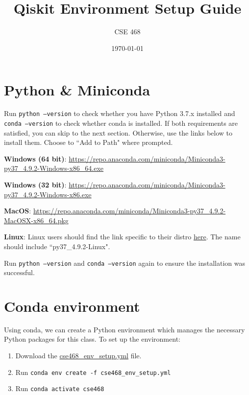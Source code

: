 \documentclass[12pt]{article}
\title{Qiskit Environment Setup Guide}
\author{CSE 468}
\date{\today}
\begin{document}
\maketitle
\tableofcontents
\newpage
\section{Python \& Miniconda}

Run \texttt{python --version} to check whether you have Python 3.7.x installed and \texttt{conda --version} to check whether conda is installed. If both requirements are satisfied, you can skip to the next section. Otherwise, use the links below to install them. Choose to ``Add to Path" where prompted. \newline

\textbf{Windows (64 bit)}:
\href{https://repo.anaconda.com/miniconda/Miniconda3-py37_4.9.2-Windows-x86_64.exe}{https://repo.anaconda.com/miniconda/Miniconda3-py37\_4.9.2-Windows-x86\_64.exe}\newline

\textbf{Windows (32 bit)}: \href{https://repo.anaconda.com/miniconda/Miniconda3-py37_4.9.2-Windows-x86.exe}{https://repo.anaconda.com/miniconda/Miniconda3-py37\_4.9.2-Windows-x86.exe}\newline

\textbf{MacOS}:
\href{https://repo.anaconda.com/miniconda/Miniconda3-py37_4.9.2-MacOSX-x86_64.pkg}{https://repo.anaconda.com/miniconda/Miniconda3-py37\_4.9.2-MacOSX-x86\_64.pkg}\newline

\textbf{Linux}:
Linux users should find the link specific to their distro \href{https://repo.anaconda.com/miniconda/}{here}. The name should include ``py37\_4.9.2-Linux". \newline

Run \texttt{python --version} and \texttt{conda --version} again to ensure the installation was successful.


\section{Conda environment}
Using conda, we can create a Python environment which manages the necessary Python packages for this class. To set up the environment:
\begin{enumerate}
    \item Download the \href{FIXME}{cse468\_env\_setup.yml} file.
    \item Run \texttt{conda env create -f cse468\_env\_setup.yml}
    \item Run \texttt{conda activate cse468}
\end{enumerate}
\end{document}
